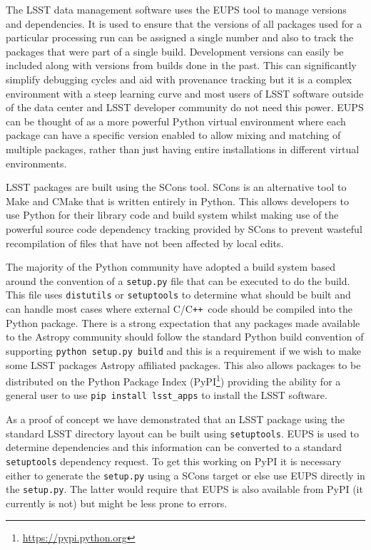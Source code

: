 \documentclass[]{spie}  %
\newcommand{\CPP}{C\texttt{++}\xspace}  %
\begin{document}
\label{sec:packaging}

The LSST data management software uses the EUPS tool\cite{EUPS} to manage versions and dependencies.
It is used to ensure that the versions of all packages used for a particular processing run can be assigned a single number and also to track the packages that were part of a single build.
Development versions can easily be included along with versions from builds done in the past.
This can significantly simplify debugging cycles and aid with provenance tracking but it is a complex environment with a steep learning curve and most users of LSST software outside of the data center and LSST developer community do not need this power.
EUPS can be thought of as a more powerful Python virtual environment where each package can have a specific version enabled to allow mixing and matching of multiple packages, rather than just having entire installations in different virtual environments.

LSST packages are built using the SCons tool\cite{2005Scons1377085}.
SCons is an alternative tool to Make and CMake that is written entirely in Python.
This allows developers to use Python for their library code and build system whilst making use of the powerful source code dependency tracking provided by SCons to prevent wasteful recompilation of files that have not been affected by local edits.

The majority of the Python community have adopted a build system based around the convention of a \texttt{setup.py} file that can be executed to do the build.
This file uses \texttt{distutils} or \texttt{setuptools} to determine what should be built and can handle most cases where external C/\CPP\ code should be compiled into the Python package.
There is a strong expectation that any packages made available to the Astropy community should follow the standard Python build convention of supporting \texttt{python setup.py build} and this is a requirement if we wish to make some LSST packages Astropy affiliated packages.
This also allows packages to be distributed on the Python Package Index (PyPI\footnote{\url{https://pypi.python.org}}) providing the ability for a general user to use \texttt{pip install lsst\_apps} to install the LSST software.

As a proof of concept we have demonstrated that an LSST package using the standard LSST directory layout can be built using \texttt{setuptools}.
EUPS is used to determine dependencies and this information can be converted to a standard \texttt{setuptools} dependency request.
To get this working on PyPI it is necessary either to generate the \texttt{setup.py} using a SCons target or else use EUPS directly in the \texttt{setup.py}.
The latter would require that EUPS is also available from PyPI (it currently is not) but might be less prone to errors.
\end{document}
